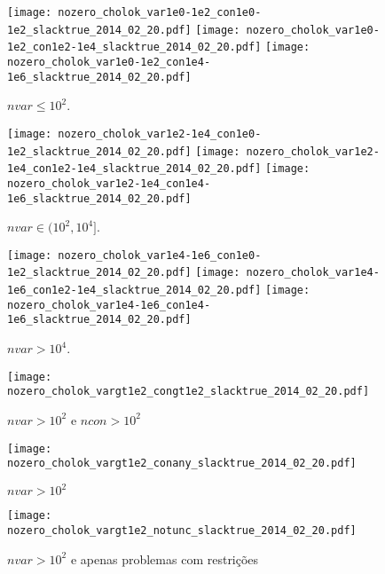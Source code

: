 \documentclass{article}
\begin{document}
\begin{figure}[H]
\centering
\texttt{[image: nozero\_cholok\_var1e0-1e2\_con1e0-1e2\_slacktrue\_2014\_02\_20.pdf]}
\texttt{[image: nozero\_cholok\_var1e0-1e2\_con1e2-1e4\_slacktrue\_2014\_02\_20.pdf]}
\texttt{[image: nozero\_cholok\_var1e0-1e2\_con1e4-1e6\_slacktrue\_2014\_02\_20.pdf]}
\caption{ $nvar \leq 10^2$. }
\label{fig:nvar_small}
\end{figure}
\begin{figure}[H]
\centering
\texttt{[image: nozero\_cholok\_var1e2-1e4\_con1e0-1e2\_slacktrue\_2014\_02\_20.pdf]}
\texttt{[image: nozero\_cholok\_var1e2-1e4\_con1e2-1e4\_slacktrue\_2014\_02\_20.pdf]}
\texttt{[image: nozero\_cholok\_var1e2-1e4\_con1e4-1e6\_slacktrue\_2014\_02\_20.pdf]}
\caption{ $nvar \in (10^2,10^4]$. }
\label{fig:nvar_medium}
\end{figure}
\begin{figure}[H]
\centering
\texttt{[image: nozero\_cholok\_var1e4-1e6\_con1e0-1e2\_slacktrue\_2014\_02\_20.pdf]}
\texttt{[image: nozero\_cholok\_var1e4-1e6\_con1e2-1e4\_slacktrue\_2014\_02\_20.pdf]}
\texttt{[image: nozero\_cholok\_var1e4-1e6\_con1e4-1e6\_slacktrue\_2014\_02\_20.pdf]}
\caption{ $nvar > 10^4$. }
\label{fig:nvar_big}
\end{figure}

\begin{figure}[H]
\centering
\texttt{[image: nozero\_cholok\_vargt1e2\_congt1e2\_slacktrue\_2014\_02\_20.pdf]}
\caption{ $nvar > 10^2$ e $ncon > 10^2$ }
\label{fig:both_medium_and_big}
\end{figure}

\begin{figure}[H]
\centering
\texttt{[image: nozero\_cholok\_vargt1e2\_conany\_slacktrue\_2014\_02\_20.pdf]}
\caption{ $nvar > 10^2$ }
\label{fig:nvar_medium_and_big}
\end{figure}

\begin{figure}[H]
\centering
\texttt{[image: nozero\_cholok\_vargt1e2\_notunc\_slacktrue\_2014\_02\_20.pdf]}
\caption{ $nvar > 10^2$ e apenas problemas com restrições }
\label{fig:nvar_medium_and_big_not_unc}
\end{figure}
\end{document}
